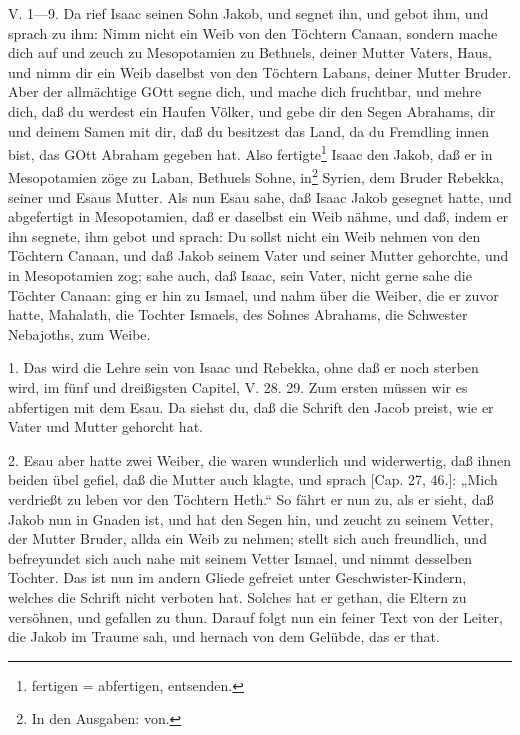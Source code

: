 V. 1—9. Da rief Isaac seinen Sohn Jakob, und segnet ihn, und gebot ihm, und sprach zu ihm: Nimm nicht ein Weib von den Töchtern Canaan, sondern mache dich auf und zeuch zu Mesopotamien zu Bethuels, deiner Mutter Vaters, Haus, und nimm dir ein Weib daselbst von den Töchtern Labans, deiner Mutter Bruder. Aber der allmächtige GOtt segne dich, und mache dich fruchtbar, und mehre dich, daß du werdest ein Haufen Völker, und gebe dir den Segen Abrahams, dir und deinem Samen mit dir, daß du besitzest das Land, da du Fremdling innen bist, das GOtt Abraham gegeben hat. Also fertigte\footnote{fertigen = abfertigen, entsenden.} Isaac den Jakob, daß er in Mesopotamien zöge zu Laban, Bethuels Sohne, in\footnote{In den Ausgaben: von.} Syrien, dem Bruder Rebekka, seiner und Esaus Mutter. Als nun Esau sahe, daß Isaac Jakob gesegnet hatte, und abgefertigt in Mesopotamien, daß er daselbst ein Weib nähme, und daß, indem er ihn segnete, ihm gebot und sprach: Du sollst nicht ein Weib nehmen von den Töchtern Canaan, und daß Jakob seinem Vater und seiner Mutter gehorchte, und in Mesopotamien zog; sahe auch, daß Isaac, sein Vater, nicht gerne sahe die Töchter Canaan: ging er hin zu Ismael, und nahm über die Weiber, die er zuvor hatte, Mahalath, die Tochter Ismaels, des Sohnes Abrahams, die Schwester Nebajoths, zum Weibe.

1. Das wird die Lehre sein von Isaac und Rebekka, ohne daß er noch sterben wird, im fünf und dreißigsten Capitel, V. 28. 29. Zum ersten müssen wir es abfertigen mit dem Esau. Da siehst du, daß die Schrift den Jacob preist, wie er Vater und Mutter gehorcht hat.

2. Esau aber hatte zwei Weiber, die waren wunderlich und widerwertig, daß ihnen beiden übel gefiel, daß die Mutter auch klagte, und sprach [Cap. 27, 46.]: „Mich verdrießt zu leben vor den Töchtern Heth.“ So fährt er nun zu, als er sieht, daß Jakob nun in Gnaden ist, und hat den Segen hin, und zeucht zu seinem Vetter, der Mutter Bruder, allda ein Weib zu nehmen; stellt sich auch freundlich, und befreyundet sich auch nahe mit seinem Vetter Ismael, und nimmt desselben Tochter. Das ist nun im andern Gliede gefreiet unter Geschwister-Kindern, welches die Schrift nicht verboten hat. Solches hat er gethan, die Eltern zu versöhnen, und gefallen zu thun. Darauf folgt nun ein feiner Text von der Leiter, die Jakob im Traume sah, und hernach von dem Gelübde, das er that.

